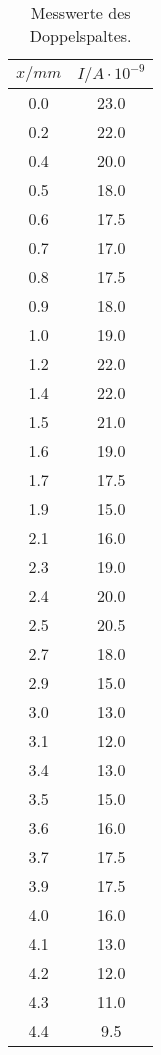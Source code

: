 \begin{table}
    \centering
\caption{Messwerte des Doppelspaltes.}
\begin{minipage}{0.25\textwidth}
    \centering
	\label{tab:a}
	\begin{tabular}{c|c}
		\toprule
		{$x / mm$} & {$I / A\cdot10^{-9}$} \\
		\hline
        \midrule
        0.0 &23.0\\
        0.2 &22.0 \\
        0.4 &20.0 \\
        0.5 &18.0 \\
        0.6 &17.5\\
        0.7 &17.0\\
        0.8 &17.5\\
        0.9 &18.0\\
        1.0 &19.0\\
        1.2 &22.0\\
        1.4 &22.0\\
        1.5 &21.0\\
        1.6 &19.0\\
        1.7 &17.5\\
        1.9 &15.0\\
        2.1 &16.0\\
        2.3 &19.0\\
        2.4 &20.0\\
        2.5 &20.5\\
        2.7 &18.0\\
        2.9 &15.0\\
        3.0 &13.0\\
        3.1 &12.0\\
        3.4 &13.0\\
        3.5 &15.0\\
        3.6 &16.0\\
        3.7 &17.5\\
        3.9 &17.5\\
        4.0 &16.0\\
        4.1 &13.0\\
        4.2 &12.0\\
        4.3 &11.0\\
        4.4 &9.5\\
		\bottomrule 
	\end{tabular}
\end{minipage}
\begin{minipage}{0.25\textwidth}
    \centering
	\label{tab:b}

\end{minipage}
\end{table}
